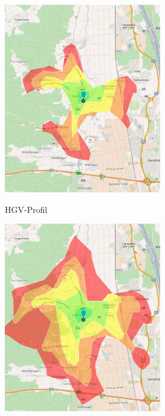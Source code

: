 \documentclass[12pt,a4paper]{article}
\begin{document}
\begin{figure}[h]
\centering
\begin{subfigure}{0.49\textwidth}
\centering
\includegraphics[width = 0.75\textwidth]{../media/isohgv.png} \\
\caption{HGV-Profil}
\label{fig:isohgv}
\end{subfigure}
\begin{subfigure}{0.49\textwidth}
\centering
\includegraphics[width = 0.75\textwidth]{../media/isocar.png} \\

\end{subfigure}
\end{figure}
\end{document}

